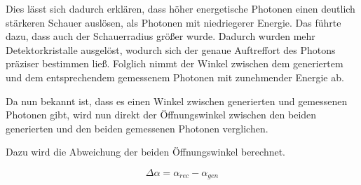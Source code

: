 \documentclass[a4paper,11pt,oneside,final,german,openbib,pdftex]{scrbook}
\begin{document}
{Dies l\"asst sich dadurch erkl\"aren, dass h\"oher energetische Photonen einen deutlich st\"arkeren Schauer ausl\"osen, als Photonen mit niedriegerer Energie. Das f\"uhrte dazu, dass auch der Schauerradius gr\"o{\ss}er wurde. Dadurch wurden mehr Detektorkristalle ausgel\"ost, wodurch sich der genaue Auftreffort des Photons pr\"aziser bestimmen lie{\ss}. Folglich nimmt der Winkel zwischen dem generiertem und dem entsprechendem gemessenem Photonen mit zunehmender Energie ab.

Da nun bekannt ist, dass es einen Winkel zwischen generierten und gemessenen Photonen gibt, wird nun direkt der \"Offnungswinkel zwischen den beiden generierten und den beiden gemessenen Photonen verglichen.

Dazu wird die Abweichung der beiden \"Offnungswinkel berechnet.

\begin{equation}
	\Delta\alpha = \alpha_{rec} - \alpha_{gen}
\end{equation}


}
\end{document}
